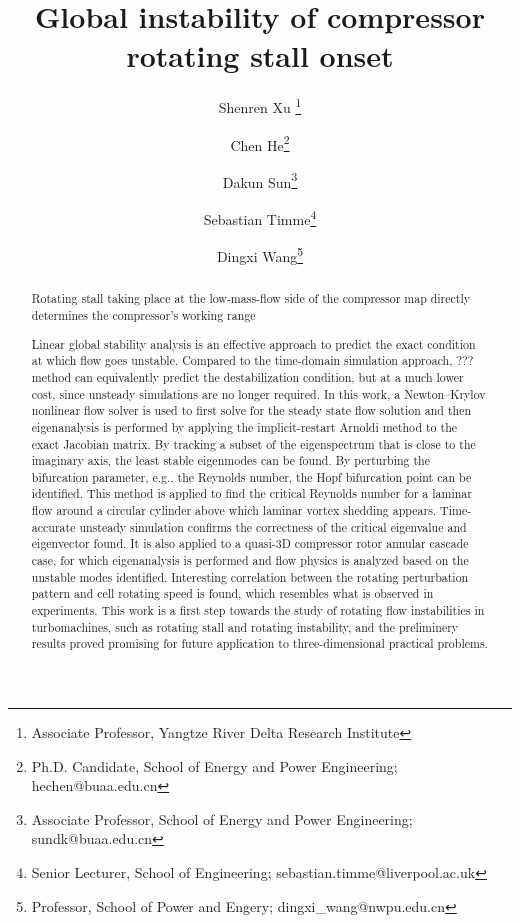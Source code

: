\documentclass[journal,final]{new-aiaa}
\title{Global instability of compressor rotating stall onset}
\author[1]{Shenren Xu	
\footnote{Associate Professor, Yangtze River Delta Research Institute}}
\affil[1]{Northwestern Polytechnical University, Taicang~215400, P.R.~China}
\affil[2]{Beihang University, Beijing 100191, P.R.~China}
\affil[3]{University of Liverpool, Liverpool xxxx, United Kingdom}
\author[2]{Chen He\footnote{Ph.D. Candidate,
School of Energy and Power Engineering; hechen@buaa.edu.cn}}
\author[2]{Dakun Sun\footnote{Associate Professor,
School of Energy and Power Engineering;
sundk@buaa.edu.cn}}
\author[3]{Sebastian Timme\footnote{Senior Lecturer,
School of Engineering; sebastian.timme@liverpool.ac.uk}}
\author[1]{Dingxi Wang\footnote{Professor,
School of Power and Engery; dingxi\_wang@nwpu.edu.cn}
}
\begin{document}
\maketitle

\begin{abstract}
Rotating stall taking place at the low-mass-flow side of the compressor
map directly determines the compressor's working range

	
Linear global stability analysis is an effective approach to predict the
exact condition at which flow goes unstable. Compared to the time-domain
simulation approach, ??? method can equivalently predict the destabilization
condition, but at a much lower cost, since unsteady simulations are no longer required.
In this work, a Newton--Krylov nonlinear flow solver is used to first solve for the
steady state flow solution and then eigenanalysis is performed by applying the 
implicit-restart Arnoldi method to the exact Jacobian matrix.
By tracking a subset of the eigenspectrum that is close to the imaginary axis,
the least stable eigenmodes can be found. By perturbing the bifurcation parameter,
e.g., the Reynolds number, the Hopf bifurcation point can be identified.
This method is applied to find the critical Reynolds number for a laminar
flow around a circular cylinder above which laminar vortex shedding appears.
Time-accurate unsteady simulation confirms the correctness of the critical eigenvalue
and eigenvector found. It is also applied to a quasi-3D compressor rotor
annular cascade case, for which eigenanalysis is performed and flow physics
is analyzed based on the unstable modes identified. Interesting correlation
between the rotating perturbation pattern and cell rotating speed is found,
which resembles what is observed in experiments.
This work is a first step towards the study of
rotating flow instabilities in turbomachines, such as rotating stall and rotating instability,
and the preliminery results proved promising for future
application to three-dimensional practical problems.
	
	
	

\end{abstract}
\end{document}

